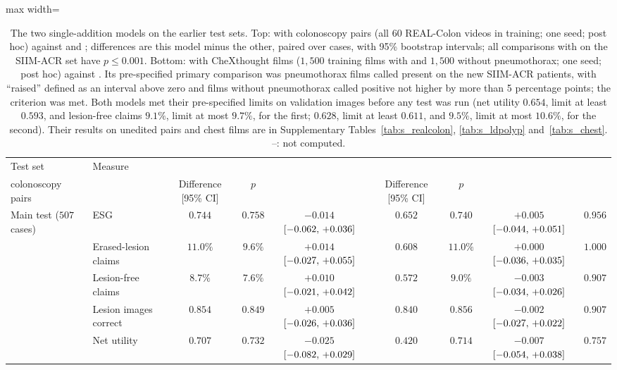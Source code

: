 \begin{table}[!htbp]
\caption{The two single-addition models on the earlier test sets. Top: \msp{} with colonoscopy pairs (all 60 REAL-Colon videos in training; one seed; post hoc) against \ms{} and \msp{}; differences are this model minus the other, paired over cases, with 95\% bootstrap intervals; all comparisons with \ms{} on the SIIM-ACR set have $p \le 0.001$. Bottom: \msp{} with CheXthought films ($1{,}500$ training films with and $1{,}500$ without pneumothorax; one seed; post hoc) against \msp{}. Its pre-specified primary comparison was pneumothorax films called present on the new SIIM-ACR patients, with ``raised'' defined as an interval above zero and films without pneumothorax called positive not higher by more than 5 percentage points; the criterion was met. Both models met their pre-specified limits on validation images before any test was run (net utility $0.654$, limit at least $0.593$, and lesion-free claims $9.1\%$, limit at most $9.7\%$, for the first; $0.628$, limit at least $0.611$, and $9.5\%$, limit at most $10.6\%$, for the second). Their results on unedited pairs and chest films are in Supplementary Tables~\ref{tab:s_realcolon}, \ref{tab:s_ldpolyp} and~\ref{tab:s_chest}. --: not computed.}
\label{tab:s_additions}
\centering
\footnotesize
\begin{adjustbox}{max width=\linewidth}
\begin{tabular}{ll c c cc c cc}
\toprule
Test set & Measure & \shortstack{\msp{} with\\colonoscopy pairs} & \ms{} & Difference [95\% CI] & $p$ & \msp{} & Difference [95\% CI] & $p$ \\
\midrule
Main test ($507$ cases) & ESG & $0.744$ & $0.758$ & $-0.014$ $[-0.062,\,+0.036]$ & $0.652$ & $0.740$ & $+0.005$ $[-0.044,\,+0.051]$ & $0.956$ \\
 & Erased-lesion claims & $11.0\%$ & $9.6\%$ & $+0.014$ $[-0.027,\,+0.055]$ & $0.608$ & $11.0\%$ & $+0.000$ $[-0.036,\,+0.035]$ & $1.000$ \\
 & Lesion-free claims & $8.7\%$ & $7.6\%$ & $+0.010$ $[-0.021,\,+0.042]$ & $0.572$ & $9.0\%$ & $-0.003$ $[-0.034,\,+0.026]$ & $0.907$ \\
 & Lesion images correct & $0.854$ & $0.849$ & $+0.005$ $[-0.026,\,+0.036]$ & $0.840$ & $0.856$ & $-0.002$ $[-0.027,\,+0.022]$ & $0.907$ \\
 & Net utility & $0.707$ & $0.732$ & $-0.025$ $[-0.082,\,+0.029]$ & $0.420$ & $0.714$ & $-0.007$ $[-0.054,\,+0.038]$ & $0.757$ \\

\end{tabular}
\end{adjustbox}
\end{table}
